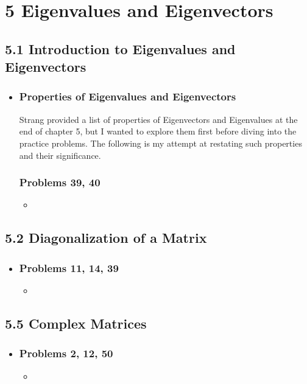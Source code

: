 \chapter{5 Eigenvalues and Eigenvectors}

\section{5.1 Introduction to Eigenvalues and Eigenvectors}
\begin{itemize}
  \item[]

  \subsection{Properties of Eigenvalues and Eigenvectors}
  Strang provided a list of properties of Eigenvectors and Eigenvalues at the
  end of chapter 5, but I wanted to explore them first before diving into the
  practice problems. The following is my attempt at restating such properties
  and their significance.

  \subsection{Problems 39, 40}
  \begin{itemize}
    \item
  \end{itemize}

\end{itemize}

\section{5.2 Diagonalization of a Matrix}
\begin{itemize}
  \item []

  \subsection{Problems 11, 14, 39}
  \begin{itemize}
    \item
  \end{itemize}

\end{itemize}

\section{5.5 Complex Matrices}
\begin{itemize}
  \item []

  \subsection{Problems 2, 12, 50}
  \begin{itemize}
    \item
  \end{itemize}

\end{itemize}

